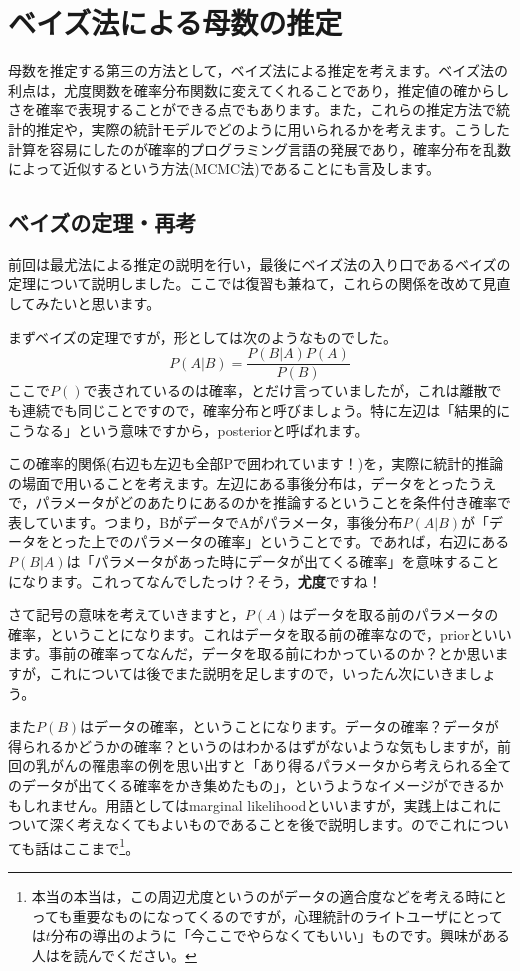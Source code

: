 \documentclass{ltjsarticle}
\begin{document}
\chapter{ベイズ法による母数の推定}
\label{chapter25}
母数を推定する第三の方法として，ベイズ法による推定を考えます。ベイズ法の利点は，尤度関数を確率分布関数に変えてくれることであり，推定値の確からしさを確率で表現することができる点でもあります。また，これらの推定方法で統計的推定や，実際の統計モデルでどのように用いられるかを考えます。こうした計算を容易にしたのが確率的プログラミング言語の発展であり，確率分布を乱数によって近似するという方法(MCMC法)であることにも言及します。
\section{ベイズの定理・再考}
前回は最尤法による推定の説明を行い，最後にベイズ法の入り口であるベイズの定理について説明しました。ここでは復習も兼ねて，これらの関係を改めて見直してみたいと思います。

まずベイズの定理ですが，形としては次のようなものでした。
$$ P(A|B) = \frac{P(B|A)P(A)}{P(B)}$$
ここで$P()$で表されているのは確率，とだけ言っていましたが，これは離散でも連続でも同じことですので，確率分布と呼びましょう。特に左辺は「結果的にこうなる」という意味ですから，posteriorと呼ばれます。

この確率的関係(右辺も左辺も全部Pで囲われています！)を，実際に統計的推論の場面で用いることを考えます。左辺にある事後分布は，データをとったうえで，パラメータがどのあたりにあるのかを推論するということを条件付き確率で表しています。つまり，BがデータでAがパラメータ，事後分布$P(A|B)$が「データをとった上でのパラメータの確率」ということです。であれば，右辺にある$P(B|A)$は「パラメータがあった時にデータが出てくる確率」を意味することになります。これってなんでしたっけ？そう，\textbf{尤度}ですね！

さて記号の意味を考えていきますと，$P(A)$はデータを取る前のパラメータの確率，ということになります。これはデータを取る前の確率なので，priorといいます。事前の確率ってなんだ，データを取る前にわかっているのか？とか思いますが，これについては後でまた説明を足しますので，いったん次にいきましょう。

また$P(B)$はデータの確率，ということになります。データの確率？データが得られるかどうかの確率？というのはわかるはずがないような気もしますが，前回の乳がんの罹患率の例を思い出すと「あり得るパラメータから考えられる全てのデータが出てくる確率をかき集めたもの」，というようなイメージができるかもしれません。用語としてはmarginal likelihoodといいますが，実践上はこれについて深く考えなくてもよいものであることを後で説明します。のでこれについても話はここまで\footnote{本当の本当は，この周辺尤度というのがデータの適合度などを考える時にとっても重要なものになってくるのですが，心理統計のライトユーザにとっては$t$分布の導出のように「今ここでやらなくてもいい」ものです。興味がある人は\citet{浜田201912}を読んでください。}。
\end{document}
